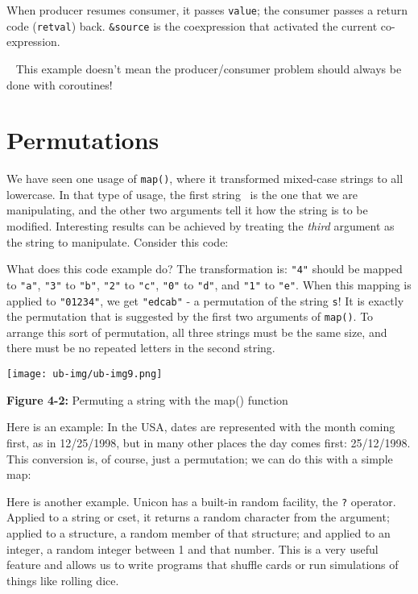 When producer resumes consumer, it passes \texttt{value}; the consumer
passes a return code (\texttt{retval}) back. \texttt{\&source} is the
coexpression that activated the current co-expression.

\bigskip{}\ {\sffamily
This example doesn't mean the producer/consumer problem
should always be done with coroutines!}

\section{Permutations}

We have seen one usage of
\texttt{map()}, where it transformed mixed-case strings to
all lowercase. In that type of usage, the first string \ is the one
that we are manipulating, and the other two arguments tell it how the
string is to be modified. Interesting results can be achieved by
treating the \textit{third} argument as the string to manipulate.
Consider this code:


What does this code example do? The transformation is:
\texttt{"4"} should be mapped to
\texttt{"a"},
\texttt{"3"} to
\texttt{"b"},
\texttt{"2"} to
\texttt{"c"},
\texttt{"0"} to
\texttt{"d"}, and
\texttt{"1"} to
\texttt{"e"}. When this mapping is applied
to \texttt{"01234"}, we get
\texttt{"edcab"} - a permutation of the
string \texttt{s}! It is exactly the permutation that is suggested by
the first two arguments of \texttt{map()}. To arrange this sort of
permutation, all three strings must be the same size, and there must be
no repeated letters in the second string.


\begin{center}
\texttt{[image: ub-img/ub-img9.png]}
\end{center}
{\sffamily\bfseries Figure 4-2:}
{\sffamily Permuting a string with the map() function}

\bigskip

Here is an example: In the USA, dates are represented with the month
coming first, as in 12/25/1998, but in many other places the day comes
first: 25/12/1998. This conversion is, of course, just a permutation;
we can do this with a simple map:


Here is another example. Unicon has a built-in random facility, the
\texttt{?} operator. Applied to a string or cset, it returns a random
character from the argument; applied to a structure, a random member of
that structure; and applied to an integer, a random integer between 1
and that number. This is a very useful feature and allows us to write
programs that shuffle cards or run simulations of things like rolling
dice.

